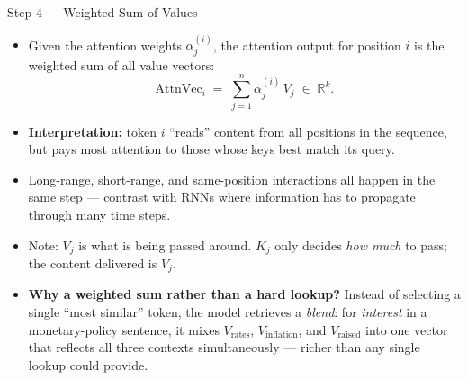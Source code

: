 \begin{frame}{Step 4 --- Weighted Sum of Values}
\begin{itemize}
\item Given the attention weights $\alpha_{j}^{(i)}$, the attention output for position $i$ is the weighted sum of all value vectors:
\[
   \text{AttnVec}_{i} \;=\; \sum_{j=1}^{n} \alpha_{j}^{(i)}\, V_{j} \;\in\; \mathbb{R}^{k}.
\]

\medskip
\item \textbf{Interpretation:} token $i$ ``reads'' content from all positions in the sequence, but pays most attention to those whose keys best match its query.

\medskip
\item Long-range, short-range, and same-position interactions all happen in the same step --- contrast with RNNs where information has to propagate through many time steps.

\medskip
\item Note: $V_j$ is what is being passed around. $K_j$ only decides \emph{how much} to pass; the content delivered is $V_j$.

\medskip
\item \textbf{Why a weighted sum rather than a hard lookup?} Instead of selecting a single ``most similar'' token, the model retrieves a \emph{blend}: for \textit{interest} in a monetary-policy sentence, it mixes $V_{\text{rates}}$, $V_{\text{inflation}}$, and $V_{\text{raised}}$ into one vector that reflects all three contexts simultaneously --- richer than any single lookup could provide.
\end{itemize}
\end{frame}

